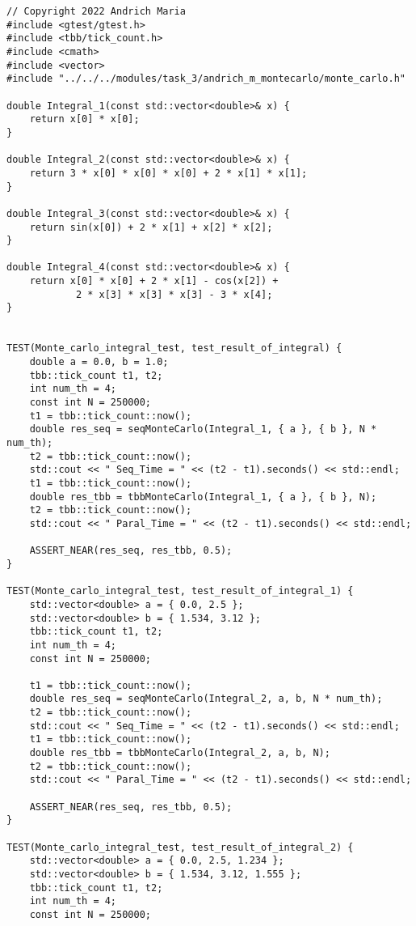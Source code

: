 \documentclass{report}
\begin{document}
\begin{lstlisting}
// Copyright 2022 Andrich Maria
#include <gtest/gtest.h>
#include <tbb/tick_count.h>
#include <cmath>
#include <vector>
#include "../../../modules/task_3/andrich_m_montecarlo/monte_carlo.h"

double Integral_1(const std::vector<double>& x) {
    return x[0] * x[0];
}

double Integral_2(const std::vector<double>& x) {
    return 3 * x[0] * x[0] * x[0] + 2 * x[1] * x[1];
}

double Integral_3(const std::vector<double>& x) {
    return sin(x[0]) + 2 * x[1] + x[2] * x[2];
}

double Integral_4(const std::vector<double>& x) {
    return x[0] * x[0] + 2 * x[1] - cos(x[2]) +
            2 * x[3] * x[3] * x[3] - 3 * x[4];
}


TEST(Monte_carlo_integral_test, test_result_of_integral) {
    double a = 0.0, b = 1.0;
    tbb::tick_count t1, t2;
    int num_th = 4;
    const int N = 250000;
    t1 = tbb::tick_count::now();
    double res_seq = seqMonteCarlo(Integral_1, { a }, { b }, N * num_th);
    t2 = tbb::tick_count::now();
    std::cout << " Seq_Time = " << (t2 - t1).seconds() << std::endl;
    t1 = tbb::tick_count::now();
    double res_tbb = tbbMonteCarlo(Integral_1, { a }, { b }, N);
    t2 = tbb::tick_count::now();
    std::cout << " Paral_Time = " << (t2 - t1).seconds() << std::endl;

    ASSERT_NEAR(res_seq, res_tbb, 0.5);
}

TEST(Monte_carlo_integral_test, test_result_of_integral_1) {
    std::vector<double> a = { 0.0, 2.5 };
    std::vector<double> b = { 1.534, 3.12 };
    tbb::tick_count t1, t2;
    int num_th = 4;
    const int N = 250000;

    t1 = tbb::tick_count::now();
    double res_seq = seqMonteCarlo(Integral_2, a, b, N * num_th);
    t2 = tbb::tick_count::now();
    std::cout << " Seq_Time = " << (t2 - t1).seconds() << std::endl;
    t1 = tbb::tick_count::now();
    double res_tbb = tbbMonteCarlo(Integral_2, a, b, N);
    t2 = tbb::tick_count::now();
    std::cout << " Paral_Time = " << (t2 - t1).seconds() << std::endl;

    ASSERT_NEAR(res_seq, res_tbb, 0.5);
}

TEST(Monte_carlo_integral_test, test_result_of_integral_2) {
    std::vector<double> a = { 0.0, 2.5, 1.234 };
    std::vector<double> b = { 1.534, 3.12, 1.555 };
    tbb::tick_count t1, t2;
    int num_th = 4;
    const int N = 250000;


\end{lstlisting}
\end{document}
